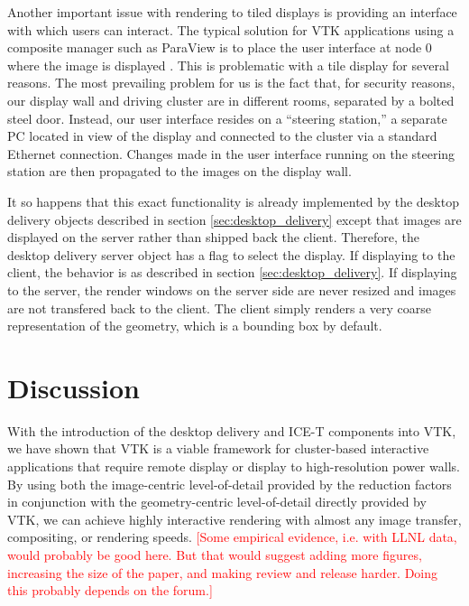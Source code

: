 \documentclass[twocolumn]{article}
\newcommand{\sticky}[1]{\textcolor{Red}{[#1]}}
\begin{document}
  Another important issue with rendering to tiled displays is providing an
  interface with which users can interact.  The typical solution for VTK
  applications using a composite manager such as ParaView is to place the
  user interface at node 0 where the image is displayed \cite{Law01}.  This
  is problematic with a tile display for several reasons.  The most
  prevailing problem for us is the fact that, for security reasons, our
  display wall and driving cluster are in different rooms, separated by a
  bolted steel door.  Instead, our user interface resides on a ``steering
  station,'' a separate PC located in view of the display and connected to
  the cluster via a standard Ethernet connection.  Changes made in the user
  interface running on the steering station are then propagated to the
  images on the display wall.

  It so happens that this exact functionality is already implemented by the
  desktop delivery objects described in section \ref{sec:desktop_delivery}
  except that images are displayed on the server rather than shipped back
  the client.  Therefore, the desktop delivery server object has a flag to
  select the display.  If displaying to the client, the behavior is as
  described in section \ref{sec:desktop_delivery}.  If displaying to the
  server, the render windows on the server side are never resized and
  images are not transfered back to the client.  The client simply renders
  a very coarse representation of the geometry, which is a bounding box by
  default.


  \section{Discussion}
  \label{sec:discussion}

  With the introduction of the desktop delivery and ICE-T components into
  VTK, we have shown that VTK is a viable framework for cluster-based
  interactive applications that require remote display or display to
  high-resolution power walls.  By using both the image-centric
  level-of-detail provided by the reduction factors in conjunction with the
  geometry-centric level-of-detail directly provided by VTK, we can achieve
  highly interactive rendering with almost any image transfer, compositing,
  or rendering speeds.  \sticky{Some empirical evidence, i.e. with LLNL
  data, would probably be good here.  But that would suggest adding more
  figures, increasing the size of the paper, and making review and release
  harder.  Doing this probably depends on the forum.}
\end{document}
